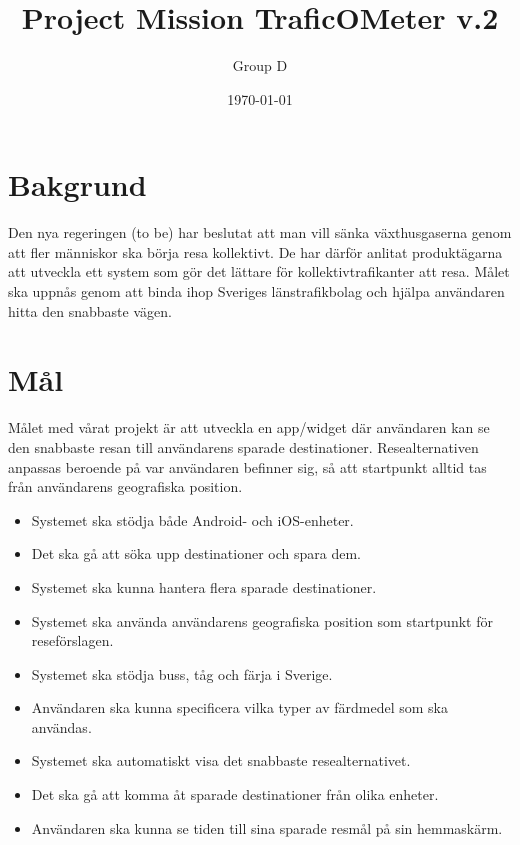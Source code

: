 \documentclass[a4paper]{article}
\title{Project Mission TraficOMeter v.2}
\author{Group D}
\date{\today}
\begin{document}
	\maketitle
	\thispagestyle{empty}
	\setcounter{page}{0}
	\pagebreak
	\tableofcontents
	\pagebreak

	\section{Bakgrund} %
	\label{sec:background}
		Den nya regeringen (to be) har beslutat att man vill sänka växthusgaserna genom att fler människor ska börja resa kollektivt. De har därför anlitat produktägarna att utveckla ett system som gör det lättare för kollektivtrafikanter att resa. Målet ska uppnås genom att binda ihop Sveriges länstrafikbolag och hjälpa användaren hitta den snabbaste vägen.
	

	\section{Mål} %
	\label{sec:m_l}
		Målet med vårat projekt är att utveckla en app/widget där användaren kan se den snabbaste resan till användarens sparade destinationer. Resealternativen anpassas beroende på var användaren befinner sig, så att startpunkt alltid tas från användarens geografiska position.

		\begin{itemize}
			\item Systemet ska stödja både Android- och iOS-enheter.
			\item Det ska gå att söka upp destinationer och spara dem.
			\item Systemet ska kunna hantera flera sparade destinationer.
			\item Systemet ska använda användarens geografiska position som startpunkt för reseförslagen.
			\item Systemet ska stödja buss, tåg och färja i Sverige.
			\item Användaren ska kunna specificera vilka typer av färdmedel som ska användas.
			\item Systemet ska automatiskt visa det snabbaste resealternativet.
			\item Det ska gå att komma åt sparade destinationer från olika enheter.
			\item Användaren ska kunna se tiden till sina sparade resmål på sin hemmaskärm.
		\end{itemize}
\end{document}
